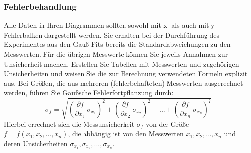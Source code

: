 \subsubsection*{Fehlerbehandlung}
Alle Daten in Ihren Diagrammen sollten sowohl mit x- als auch mit y-Fehlerbalken dargestellt werden.
Sie erhalten bei der Durchführung des Experimentes aus den Gauß-Fits bereits die Standardabweichungen zu den Messwerten. 
Für die übrigen Messwerte können Sie jeweils Annahmen zur Unsicherheit machen. 
Erstellen Sie Tabellen mit Messwerten und zugehörigen Unsicherheiten und weisen Sie die zur Berechnung verwendeten Formeln explizit aus.
Bei Größen, die aus mehreren (fehlerbehafteten) Messwerten ausgerechnet werden, führen Sie Gaußsche Fehlerfortpflanzung durch:
\begin{equation}\label{eq:RSS}
	\sigma_{f} = \sqrt{\left( \frac{\partial f}{\partial x_1}\ \sigma_{x_1} \right)^2 + \left( \frac{\partial f}{\partial x_2}\ \sigma_{x_2} \right)^2 + ... + \left( \frac{\partial f}{\partial x_n}\ \sigma_{x_n} \right)^2} 
\end{equation}
Hierbei errechnet sich die Messunsicherheit $\sigma_{f}$ von der Größe $f = f (x_1, x_2, ... , x_n)$, die abhängig ist von den Messwerten $x_1, x_2, ... , x_n$ und deren Unsicherheiten $\sigma_{x_1}, \sigma_{x_2}, ..., \sigma_{x_n}$. 





